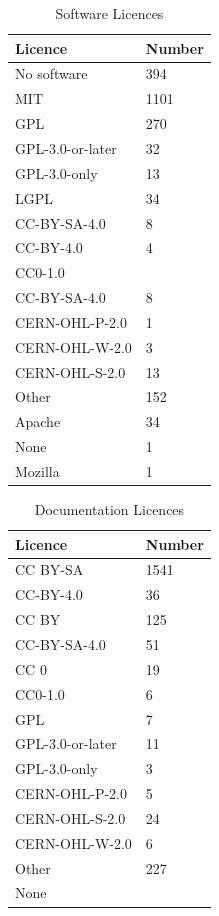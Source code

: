 \documentclass[final-report.tex]{subfiles}
\begin{document}
\begin{table}[h!]
        \centering
        \begin{tabular}{| l | l |}
        \toprule
            Licence & Number \\
        \midrule
        \midrule
            No software & 394 \\
        \midrule
            MIT & 1101 \\
        \midrule
            GPL & 270 \\
            GPL-3.0-or-later & 32 \\
            GPL-3.0-only & 13 \\
            LGPL & 34 \\
        \midrule
            CC-BY-SA-4.0 & 8 \\
            CC-BY-4.0 & 4 \\
            CC0-1.0 &  \\
            CC-BY-SA-4.0 & 8 \\
        \midrule
            CERN-OHL-P-2.0 & 1 \\
            CERN-OHL-W-2.0 & 3 \\
            CERN-OHL-S-2.0 & 13 \\
        \midrule
            Other & 152 \\
            Apache & 34 \\
            None & 1 \\
            Mozilla & 1 \\
        \bottomrule
        \end{tabular}
        \caption{Software Licences}
        \label{tab:slic}
\end{table}
\begin{table}[h!]
        \centering
        \begin{tabular}{| l | l |}
        \toprule
                Licence & Number \\
        \midrule
        \midrule
            CC BY-SA & 1541 \\
            CC-BY-4.0 & 36 \\
            CC BY & 125 \\
            CC-BY-SA-4.0 & 51 \\
            CC 0 & 19 \\
            CC0-1.0 & 6 \\
        \midrule
            GPL & 7 \\
            GPL-3.0-or-later & 11 \\
            GPL-3.0-only & 3 \\
        \midrule
            CERN-OHL-P-2.0 & 5 \\
            CERN-OHL-S-2.0 & 24 \\
            CERN-OHL-W-2.0 & 6 \\
            Other & 227 \\
            None &  \\
        \bottomrule
        \end{tabular}
        \caption{Documentation Licences}
        \label{tab:dlic}
\end{table}
% 
\end{document}
